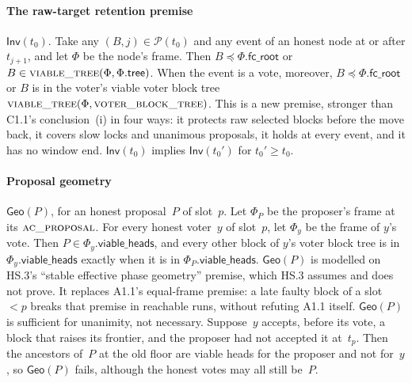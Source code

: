 \documentclass{article}
\newcommand{\Fr}{\Phi}
\newcommand{\fcroot}{\mathsf{fc\_root}}
\newcommand{\allowed}{\mathsf{viable\_heads}}
\newcommand{\fname}[1]{\text{\textsc{#1}}}
\newcommand{\filtered}{\fname{viable\_tree}}
\begin{document}
\paragraph{The raw-target retention premise} $\mathsf{Inv}(t_0)$.  Take any
$(B,j)\in\mathcal P(t_0)$ and any event of an honest node at or after
$t_{j+1}$, and let $\Fr$ be the node's frame.  Then $B\preceq\Fr.\fcroot$ or
$B\in\filtered(\Fr,\Fr.\mathsf{tree})$.  When the event is a vote, moreover,
$B\preceq\Fr.\fcroot$ or $B$ is in the voter's viable voter block tree
$\filtered(\Fr,\fname{voter\_block\_tree})$.
This is a new premise, stronger than C1.1's conclusion~(i) in four ways: it
protects raw selected blocks before the move back, it covers slow locks and
unanimous proposals, it holds at every event, and it has no window end.
$\mathsf{Inv}(t_0)$ implies $\mathsf{Inv}(t_0')$ for $t_0'\geq t_0$.

\paragraph{Proposal geometry} $\mathsf{Geo}(P)$, for an honest proposal~$P$
of slot~$p$.  Let $\Fr_P$ be the proposer's frame at its
$\fname{ac\_proposal}$.  For every honest voter~$y$ of slot~$p$, let $\Fr_y$
be the frame of $y$'s vote.  Then $P\in\Fr_y.\allowed$, and every other
block of $y$'s voter block tree is in $\Fr_y.\allowed$ exactly when it is in
$\Fr_P.\allowed$.
$\mathsf{Geo}(P)$ is modelled on HS.3's ``stable effective phase geometry''
premise, which HS.3 assumes and does not prove.  It replaces A1.1's
equal-frame premise: a late faulty block of a slot $<p$ breaks that premise
in reachable runs, without refuting A1.1 itself.
$\mathsf{Geo}(P)$ is sufficient for unanimity, not necessary.  Suppose~$y$
accepts, before its vote, a block that raises its frontier, and the proposer
had not accepted it at~$t_p$.  Then the ancestors of~$P$ at the old floor are
viable heads for the proposer and not for~$y$, so $\mathsf{Geo}(P)$ fails,
although the honest votes may all still be~$P$.
\end{document}
